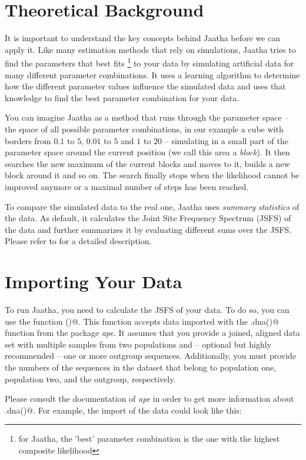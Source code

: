 \documentclass[a4paper]{article}
\begin{document}
\section{Theoretical Background}
\noindent
It is important to understand the key concepts behind Jaatha before we can apply it. Like many
estimation methods that rely on simulations, Jaatha tries to find the parameters that best fits
\footnote{for Jaatha, the 'best' parameter combination is the one with the highest
composite likelihood} to your data by simulating artificial data for many different parameter
combinations. It uses a learning algorithm to determine how the different parameter
values influence the simulated data and uses that knowledge to find the best parameter combination for 
your data. 

You can imagine Jaatha as a method that runs through the parameter space -- the space
of all possible parameter combinations, in our example a cube with borders from $0.1$ to $5$, 
$0.01$ to $5$ and $1$ to $20$ -- simulating in a small part of the parameter space
around the current position (we call this area a \emph{block}). It then searches the new maximum
of the current blocks and moves to it, builds a new block around it and so on. The search finally 
stops when the likelihood cannot be improved anymore or a maximal number of steps has been reached.

To compare the simulated data to the real one, Jaatha uses \emph{summary statistics} of the data.
As default, it calculates the Joint Site Frequency Spectrum (JSFS) of the data and further summarizes
it by evaluating different sums over the JSFS. Please refer to \cite{naduvilezhath_jaatha:_2011} for a detailed
description.


\section{Importing Your Data}
\noindent
To run Jaatha, you need to calculate the JSFS of your data. To do so, you can
use the function \verb@calculateJsfs()@. This function accepts data imported
with the \verb@read.dna()@ function from the package \emph{ape}. It assumes that you provide
a joined, aligned data set with multiple samples from two populations and -- optional 
but highly recommended -- one or more outgroup sequences. Additionally, you must
provide the numbers of the sequences in the dataset that belong to population
one, population two, and the outgroup, respectively.

Please consult the documentation of \emph{ape} in order to get more information
about \verb@read.dna()@. For example, the import of the data could look like this:  
\end{document}

